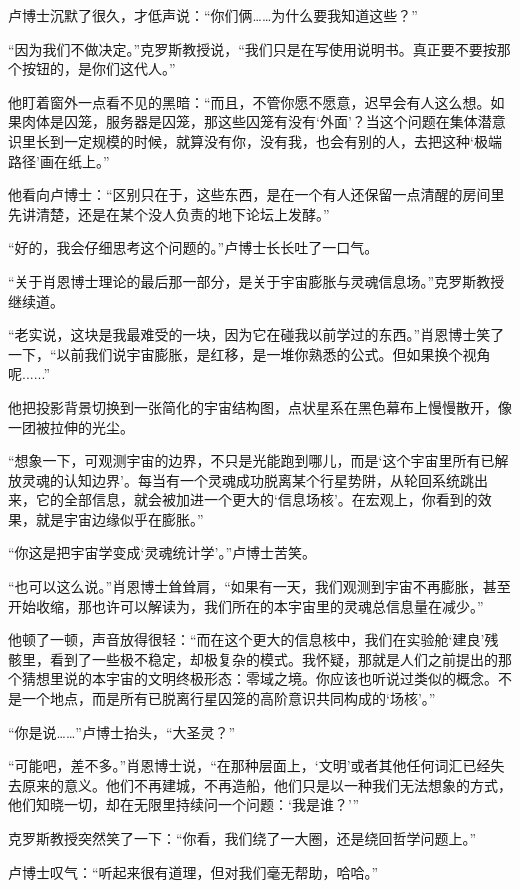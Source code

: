 卢博士沉默了很久，才低声说：“你们俩……为什么要我知道这些？”

“因为我们不做决定。”克罗斯教授说，“我们只是在写使用说明书。真正要不要按那个按钮的，是你们这代人。”

他盯着窗外一点看不见的黑暗：“而且，不管你愿不愿意，迟早会有人这么想。如果肉体是囚笼，服务器是囚笼，那这些囚笼有没有‘外面’？当这个问题在集体潜意识里长到一定规模的时候，就算没有你，没有我，也会有别的人，去把这种‘极端路径’画在纸上。”

他看向卢博士：“区别只在于，这些东西，是在一个有人还保留一点清醒的房间里先讲清楚，还是在某个没人负责的地下论坛上发酵。”

“好的，我会仔细思考这个问题的。”卢博士长长吐了一口气。

“关于肖恩博士理论的最后那一部分，是关于宇宙膨胀与灵魂信息场。”克罗斯教授继续道。

“老实说，这块是我最难受的一块，因为它在碰我以前学过的东西。”肖恩博士笑了一下，“以前我们说宇宙膨胀，是红移，是一堆你熟悉的公式。但如果换个视角呢......”

他把投影背景切换到一张简化的宇宙结构图，点状星系在黑色幕布上慢慢散开，像一团被拉伸的光尘。

“想象一下，可观测宇宙的边界，不只是光能跑到哪儿，而是‘这个宇宙里所有已解放灵魂的认知边界’。每当有一个灵魂成功脱离某个行星势阱，从轮回系统跳出来，它的全部信息，就会被加进一个更大的‘信息场核’。在宏观上，你看到的效果，就是宇宙边缘似乎在膨胀。”

“你这是把宇宙学变成‘灵魂统计学’。”卢博士苦笑。

“也可以这么说。”肖恩博士耸耸肩，“如果有一天，我们观测到宇宙不再膨胀，甚至开始收缩，那也许可以解读为，我们所在的本宇宙里的灵魂总信息量在减少。”

他顿了一顿，声音放得很轻：“而在这个更大的信息核中，我们在实验舱‘建良’残骸里，看到了一些极不稳定，却极复杂的模式。我怀疑，那就是人们之前提出的那个猜想里说的本宇宙的文明终极形态：零域之境。你应该也听说过类似的概念。不是一个地点，而是所有已脱离行星囚笼的高阶意识共同构成的‘场核’。”

“你是说……”卢博士抬头，“大圣灵？”

“可能吧，差不多。”肖恩博士说，“在那种层面上，‘文明’或者其他任何词汇已经失去原来的意义。他们不再建城，不再造船，他们只是以一种我们无法想象的方式，他们知晓一切，却在无限里持续问一个问题：‘我是谁？’”

克罗斯教授突然笑了一下：“你看，我们绕了一大圈，还是绕回哲学问题上。”

卢博士叹气：“听起来很有道理，但对我们毫无帮助，哈哈。”

